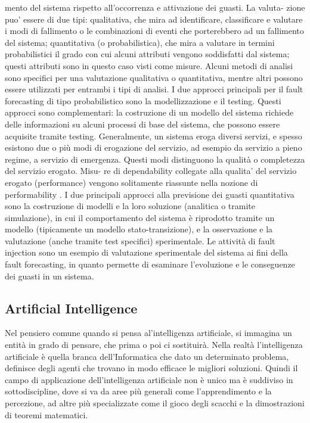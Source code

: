 \documentclass[14pt]{extarticle}
\begin{document}
mento del sistema rispetto all’occorrenza e attivazione dei guasti. La valuta-
zione puo’ essere di due tipi: qualitativa, che mira ad identificare, classificare
e valutare i modi di fallimento o le combinazioni di eventi che porterebbero ad
un fallimento del sistema; quantitativa (o probabilistica), che mira a valutare
in termini probabilistici il grado con cui alcuni attributi vengono soddisfatti
dal sistema; questi attributi sono in questo caso visti come misure. Alcuni
metodi di analisi sono specifici per una valutazione qualitativa o quantitativa, mentre altri possono essere utilizzati per entrambi i tipi di analisi. I due approcci principali per il fault forecasting di tipo probabilistico sono la modellizzazione e il testing. Questi approcci sono complementari: la costruzione di
un modello del sistema richiede delle informazioni su alcuni processi di base
del sistema, che possono essere acquisite tramite testing. Generalmente, un
sistema eroga diversi servizi, e spesso esistono due o più modi di erogazione
del servizio, ad esempio da servizio a pieno regime, a servizio di emergenza.
Questi modi distinguono la qualità o completezza del servizio erogato. Misu-
re di dependability collegate alla qualita’ del servizio erogato (performance)
vengono solitamente riassunte nella nozione di performability \cite{smith1988performability}.
I due principali approcci alla previsione dei guasti quantitativa sono la
costruzione di modelli e la loro soluzione (analitica o tramite simulazione), in
cui il comportamento del sistema è riprodotto tramite un modello (tipicamente
un modello stato-transizione), e la osservazione e la valutazione (anche tramite
test specifici) sperimentale. Le attività di fault injection sono un esempio di
valutazione sperimentale del sistema ai fini della fault forecasting, in quanto
permette di esaminare l’evoluzione e le conseguenze dei guasti in un sistema.


\subsection{Artificial Intelligence}
Nel pensiero comune quando si pensa al'intelligenza artificiale, si immagina un entità in grado di pensare, che prima o poi ci sostituirà. Nella realtà l'intelligenza artificiale è quella branca dell'Informatica che dato un determinato problema, definisce degli agenti che trovano in modo efficace le migliori soluzioni. Quindi il campo di  applicazione dell'intelligenza artificiale non è unico ma è suddiviso in sottodiscipline, dove si va da aree più generali come l'apprendimento e la percezione, ad altre più specializzate come il gioco degli scacchi e la dimostrazioni di teoremi matematici.
\end{document}
